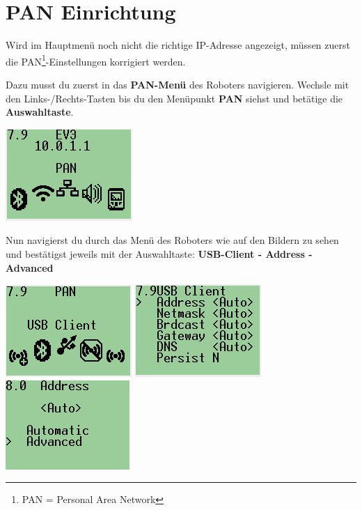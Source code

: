 	\section{PAN Einrichtung}
		\label{sec:pan}
		Wird im Hauptmenü noch nicht die richtige IP-Adresse angezeigt, müssen zuerst die PAN\footnote{PAN = Personal Area Network}-Einstellungen korrigiert werden.
		
		\begin{enumerate}	
			\begin{minipage}{.45\textwidth}
				\item Dazu musst du zuerst in das \textbf{PAN-Menü} des Roboters navigieren. Wechsle mit den Links-/Rechts-Tasten bis du den Menüpunkt \textbf{PAN} siehst und betätige die \textbf{Auswahltaste}.
			\end{minipage}
			\hfill
			\begin{minipage}{.45\textwidth}
				\includegraphics[width=.8\textwidth]{img/ev3_pan.png}
			\end{minipage}
			
			\item Nun navigierst du durch das Menü des Roboters wie auf den Bildern zu sehen und bestätigst jeweils mit der Auswahltaste: \textbf{USB-Client - Address - Advanced}
			
			\includegraphics[width=.3\textwidth]{img/ev3_pan_usb.png}
			\includegraphics[width=.3\textwidth]{img/ev3_pan_usb_address.png}		
			\includegraphics[width=.3\textwidth]{img/ev3_pan_usb_advanced.png}
			

\end{enumerate}
